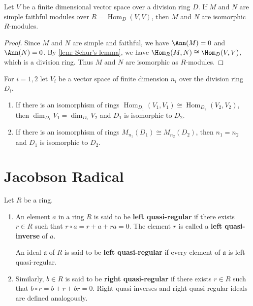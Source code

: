 \begin{lemma}
    Let $V$ be a finite dimensional vector space over a division ring $D$.
    If $M$ and $N$ are simple faithful modules over $R=\operatorname{Hom}_{D}(V, V)$, then $M$ and $N$ are isomorphic $R$-modules.
    \begin{proof}
        Since $M$ and $N$ are simple and faithful, we have $\Ann(M)=0$ and $\Ann(N)=0$.
        By \cref{lem: Schur's lemma}, we have $\Hom_{R}(M, N) \cong \Hom_{D}(V, V)$, which is a division ring. Thus $M$ and $N$ are isomorphic as $R$-modules.
    \end{proof}
\end{lemma}

\begin{proposition}
    For $i=1,2$ let $V_{i}$ be a vector space of finite dimension $n_{i}$ over the division ring $D_{i}$.
    \begin{enumerate}
        \item
              If there is an isomorphism of rings $\operatorname{Hom}_{D_1}\left(V_1, V_1\right) \cong \operatorname{Hom}_{D_2}\left(V_2, V_2\right)$, then $\operatorname{dim}_{D_1} V_1=\operatorname{dim}_{D_2} V_2$ and $D_1$ is isomorphic to $D_2$.
        \item
              If there is an isomorphism of rings $M_{n_1} \left(D_1\right) \cong M_{n_2} \left(D_2\right)$, then $n_1=n_2$ and $D_1$ is isomorphic to $D_2$.
    \end{enumerate}
\end{proposition}



\section{Jacobson Radical} %
\begin{definition}
    Let $R$ be a ring.
    \begin{enumerate}
        \item
              An element $a$ in a ring $R$ is said to be  \textbf{left quasi-regular} if there exists $r \in R$ such that $r \circ a=r+a+ra=0$.
              The element $r$ is called a \textbf{left quasi-inverse} of $a$.

              An ideal $\mathfrak{a}$ of $R$ is said to be \textbf{left quasi-regular} if every element of $\mathfrak{a}$ is left quasi-regular.

        \item
              Similarly, $b \in R$ is said to be \textbf{right quasi-regular} if there exists $r \in R$ such that $b\circ r = b+r+br=0$. Right quasi-inverses and right quasi-regular ideals are defined analogously.
    \end{enumerate}
\end{definition}



